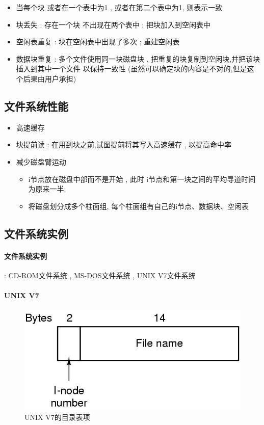 \documentclass[UTF8,a4paper]{ctexart}
\begin{document}
\begin{itemize}
	\item 当每个块 或者在一个表中为1 , 或者在第二个表中为1, 则表示一致
	\item 块丢失 : 存在一个块 不出现在两个表中 ; 把块加入到空闲表中
	\item 空闲表重复 : 块在空闲表中出现了多次 ; 重建空闲表
	\item 数据块重复 : 多个文件使用同一块磁盘块 , 把重复的块复制到空闲块,并把该块插入到其中一个文件 以保持一致性 (虽然可以确定块的内容是不对的,但是这个后果由用户承担)
\end{itemize}

\subsection{文件系统性能}
\begin{itemize}
	\item 高速缓存
	\item 块提前读 : 在用到块之前,试图提前将其写入高速缓存 , 以提高命中率
	\item 减少磁盘臂运动
	      \begin{itemize}
		      \item i节点放在磁盘中部而不是开始 , 此时 i节点和第一块之间的平均寻道时间为原来一半;
		      \item 将磁盘划分成多个柱面组, 每个柱面组有自己的i节点、数据块、空闲表
	      \end{itemize}
\end{itemize}

\subsection{文件系统实例}
\paragraph{文件系统实例} : CD-ROM文件系统 , MS-DOS文件系统 , UNIX V7文件系统

\paragraph{UNIX V7}
\begin{figure}[H]
	\centering
	\includegraphics[scale = 0.3]{assets/ModernOperatingSystems/2018-01-08-19-49-10.png}
	\caption{UNIX V7的目录表项}
\end{figure}
\end{document}

